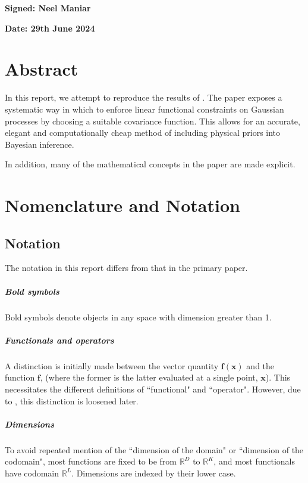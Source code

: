 \documentclass[12pt,a4paper,twoside]{report}
\theoremstyle{definition}
\begin{document}
\bigskip 
\textbf{Signed: Neel Maniar}

\bigskip
\textbf{Date: 29th June 2024}
\vspace{\fill}

\chapter*{Abstract}
In this report, we attempt to reproduce the results of \cite{Jidling}. The paper exposes a systematic way in which to enforce linear functional constraints on Gaussian processes by choosing a suitable covariance function. This allows for an accurate, elegant and computationally cheap method of including physical priors into Bayesian inference.

In addition, many of the mathematical concepts in the paper are made explicit.

\chapter*{Nomenclature and Notation}\label{nomenclature}

\section{Notation}
The notation in this report differs from that in the primary paper.

\paragraph{Bold symbols}Bold symbols denote objects in any space with dimension greater than 1. 

\paragraph{Functionals and operators}A distinction is initially made between the vector quantity $\mathbf f(\mathbf x)$ and the function $\mathbf f$, (where the former is the latter evaluated at a single point, $\mathbf x$). This necessitates the different definitions of ``functional" and ``operator". However, due to , this distinction is loosened later.

\paragraph{Dimensions}To avoid repeated mention of the ``dimension of the domain" or ``dimension of the codomain", most functions are fixed to be from $\mathbb{R}^D$ to $\mathbb{R}^K$, and most functionals have codomain $\mathbb{R}^L$. Dimensions are indexed by their lower case.
\end{document}
